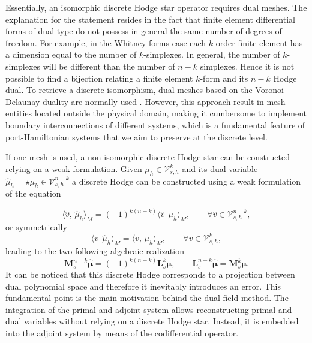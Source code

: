 \documentclass{elsarticle}
\newcommand*{\dual}[1]{\ensuremath{\widehat{#1}}}
\newcommand{\inpr}[3][]{\ensuremath{\langle #2, \, #3 \rangle_{#1}}}
\newcommand{\dualpr}[3][]{\ensuremath{\langle #2 \, \vert #3 \rangle_{#1}}}
\begin{document}
Essentially, an isomorphic discrete Hodge star operator requires dual meshes.
The explanation for the statement resides in the fact that finite element differential forms of dual type do not possess in general the same number of degrees of freedom. For example, in the Whitney forms case each $k$-order finite element has a dimension equal to the number of $k$-simplexes. In general, the number of $k$-simplexes will be different than the number of $n-k$ simplexes. Hence it is not possible to find a bijection relating a finite element $k$-form and its $n-k$ Hodge dual. To retrieve a discrete isomorphism, dual meshes based on the Voronoi-Delaunay duality are normally used \cite{hirani2003discrete,hiptmair2001}. However, this approach result in mesh entities located outside the physical domain, making it cumbersome to implement boundary interconnections of different systems, which is a fundamental feature of port-Hamiltonian systems that we aim to preserve at the discrete level.

If one mesh is used, a non isomorphic discrete Hodge star can be constructed relying on a weak formulation. Given $\mu_h \in \mathcal{V}_{s, h}^{k}$ and its dual variable $\dual{\mu}_h = \star \mu_h \in \mathcal{V}_{s, h}^{n-k}$ a discrete Hodge can be constructed using a weak formulation of the equation 

\begin{equation}
    \inpr[M]{\dual{v}}{\dual{\mu}_h} = (-1)^{k(n-k)} \dualpr[M]{\dual{v}}{\mu_h}, \qquad \forall \dual{v} \in \mathcal{V}_{s, h}^{n-k},
\end{equation}
or symmetrically
\begin{equation}
    \dualpr[M]{v}{\dual{\mu}_h} =\inpr[M]{v}{\mu_h}, \qquad \forall v \in \mathcal{V}_{s, h}^{k},
\end{equation}
leading to the two following algebraic realization
\begin{equation}\label{eq:alg_hodge}
    \mathbf{M}^{n-k}_s \dual{\bm{\mu}} = (-1)^{k(n-k)} \mathbf{L}^{k}_s {\bm{\mu}}, \qquad \mathbf{L}^{n-k}_s \dual{\bm{\mu}}  = \mathbf{M}^{k}_s \bm{\mu}.
\end{equation}
It can be noticed that this discrete Hodge corresponds to a projection between dual polynomial space and therefore it inevitably introduces an error. This fundamental point is the main motivation behind the dual field method. The integration of the primal and adjoint system allows reconstructing primal and dual variables without relying on a discrete Hodge star. Instead, it is embedded into the adjoint system by means of the codifferential operator.
\end{document}
